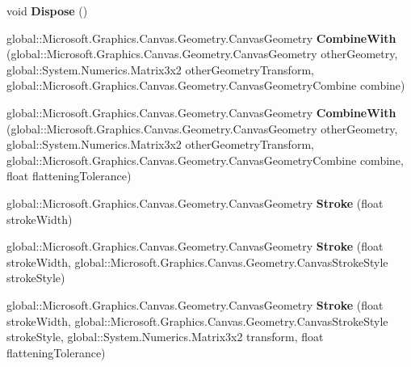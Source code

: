 \begin{DoxyCompactItemize}
void {\bfseries Dispose} ()
\item 
\mbox{\label{class_microsoft_1_1_graphics_1_1_canvas_1_1_geometry_1_1_canvas_geometry_aaf62c4106c1df76395cb0e89a2663f79}} 
global\+::\+Microsoft.\+Graphics.\+Canvas.\+Geometry.\+Canvas\+Geometry {\bfseries Combine\+With} (global\+::\+Microsoft.\+Graphics.\+Canvas.\+Geometry.\+Canvas\+Geometry other\+Geometry, global\+::\+System.\+Numerics.\+Matrix3x2 other\+Geometry\+Transform, global\+::\+Microsoft.\+Graphics.\+Canvas.\+Geometry.\+Canvas\+Geometry\+Combine combine)
\item 
\mbox{\label{class_microsoft_1_1_graphics_1_1_canvas_1_1_geometry_1_1_canvas_geometry_adad804adc3470601bc8179651be8521e}} 
global\+::\+Microsoft.\+Graphics.\+Canvas.\+Geometry.\+Canvas\+Geometry {\bfseries Combine\+With} (global\+::\+Microsoft.\+Graphics.\+Canvas.\+Geometry.\+Canvas\+Geometry other\+Geometry, global\+::\+System.\+Numerics.\+Matrix3x2 other\+Geometry\+Transform, global\+::\+Microsoft.\+Graphics.\+Canvas.\+Geometry.\+Canvas\+Geometry\+Combine combine, float flattening\+Tolerance)
\item 
\mbox{\label{class_microsoft_1_1_graphics_1_1_canvas_1_1_geometry_1_1_canvas_geometry_a8af3ce8304eae3ecf06add5210d5b498}} 
global\+::\+Microsoft.\+Graphics.\+Canvas.\+Geometry.\+Canvas\+Geometry {\bfseries Stroke} (float stroke\+Width)
\item 
\mbox{\label{class_microsoft_1_1_graphics_1_1_canvas_1_1_geometry_1_1_canvas_geometry_aa6cb309b9284fbf870333f012b0bdf86}} 
global\+::\+Microsoft.\+Graphics.\+Canvas.\+Geometry.\+Canvas\+Geometry {\bfseries Stroke} (float stroke\+Width, global\+::\+Microsoft.\+Graphics.\+Canvas.\+Geometry.\+Canvas\+Stroke\+Style stroke\+Style)
\item 
\mbox{\label{class_microsoft_1_1_graphics_1_1_canvas_1_1_geometry_1_1_canvas_geometry_acd5ab184e01cc9bd574ccbe0932c0dfd}} 
global\+::\+Microsoft.\+Graphics.\+Canvas.\+Geometry.\+Canvas\+Geometry {\bfseries Stroke} (float stroke\+Width, global\+::\+Microsoft.\+Graphics.\+Canvas.\+Geometry.\+Canvas\+Stroke\+Style stroke\+Style, global\+::\+System.\+Numerics.\+Matrix3x2 transform, float flattening\+Tolerance)

\end{DoxyCompactItemize}
